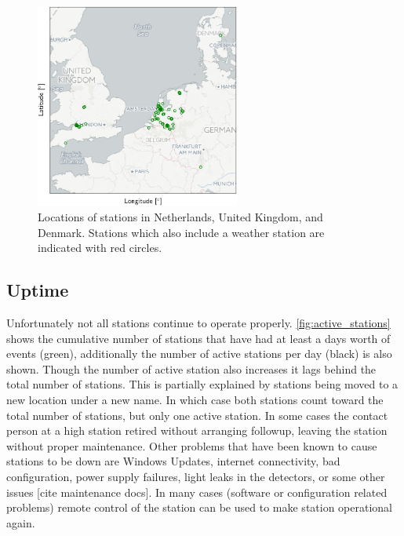 \begin{figure}
    \centering
    \includegraphics[width=0.6\textwidth]
                    {plots/cluster/network}
    \caption{Locations of \hisparc stations in Netherlands, United Kingdom, and Denmark. Stations which also include a weather station are indicated with red circles.}
    \label{fig:network}
\end{figure}


\subsection{Uptime}

Unfortunately not all stations continue to operate properly. \cref{fig:active_stations} shows the cumulative number of stations that have had at least a days worth of events (green), additionally the number of active stations per day (black) is also shown. Though the number of active station also increases it lags behind the total number of stations. This is partially explained by stations being moved to a new location under a new name. In which case both stations count toward the total number of stations, but only one active station. In some cases the contact person at a high station retired without arranging followup, leaving the station without proper maintenance. Other problems that have been known to cause stations to be down are Windows Updates, internet connectivity, bad configuration, power supply failures, light leaks in the detectors, or some other issues [cite maintenance docs]. In many cases (software or configuration related problems) remote control of the station can be used to make station operational again.

